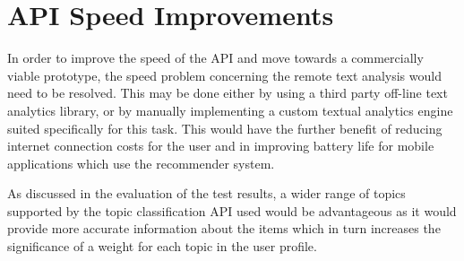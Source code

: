 \section{API Speed Improvements}

In order to improve the speed of the API and move towards a commercially viable prototype, the speed problem concerning the remote text analysis would need to be resolved. This may be done either by using a third party off-line text analytics library, or by manually implementing a custom textual analytics engine suited specifically for this task. This would have the further benefit of reducing internet connection costs for the user and in improving battery life for mobile applications which use the recommender system. 

As discussed in the evaluation of the test results, a wider range of topics supported by the topic classification API used would be advantageous as it would provide more accurate information about the items which in turn increases the significance of a weight for each topic in the user profile. 

